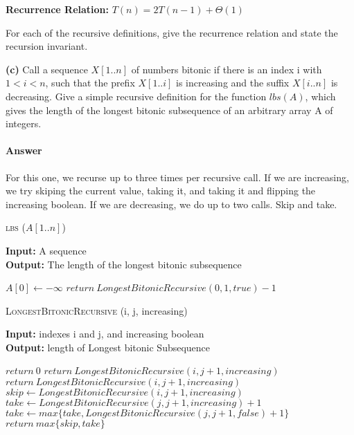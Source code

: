 \documentclass{article}
\begin{document}
{\bf Recurrence Relation: } $T(n) = 2T(n-1) + \Theta(1)$

\todo{}



For each of the recursive definitions, give the recurrence
relation and state the recursion invariant.

{\bf (c)} Call a sequence $X[1.. n]$ of numbers bitonic if there is an index i with
$1 < i < n$, such that the prefix $X[1.. i]$ is increasing and the suffix
$X[i .. n]$ is decreasing. Give a simple recursive definition for the function
$lbs(A)$, which gives the length of the longest bitonic subsequence of an
arbitrary array A of integers.

\paragraph{Answer}

For this one, we recurse up to three times per recursive call. If we are increasing, we try
skiping the current value, taking it, and taking it and flipping the increasing boolean.
If we are decreasing, we do up to two calls. Skip and take.

\begin{algorithm} \caption{\textsc{lbs} ($A[1..n]$)}\label{alg:seb}
    {\bf Input:} A sequence\\
    {\bf Output:} The length of the longest bitonic subsequence
    \begin{algorithmic}[1]
        \State$A[0] \gets -\infty$
        \State$return\ LongestBitonicRecursive(0, 1, true) -1$
    \end{algorithmic}
\end{algorithm}

\begin{algorithm} \caption{\textsc{LongestBitonicRecursive} (i, j, increasing)}\label{alg:seb}
    {\bf Input:} indexes i and j, and increasing boolean\\
    {\bf Output:} length of Longest bitonic Subsequence
    \begin{algorithmic}[1]
            \State$return\ 0$
                \State$return\ LongestBitonicRecursive(i, j+1, increasing)$
            \EndIf{}
        \Else{}
                \State$return\ LongestBitonicRecursive(i, j+1, increasing)$
            \EndIf{}
        \EndIf{}
        \State$skip \gets LongestBitonicRecursive(i, j+1, increasing)$
        \State$take \gets LongestBitonicRecursive(j, j+1, increasing) +1$
            \State$take \gets max\{take, LongestBitonicRecursive(j, j+1, false) +1\}$
        \EndIf{}
        \State$return\ max\{skip, take\}$
    \end{algorithmic}
\end{algorithm}
\end{document}
